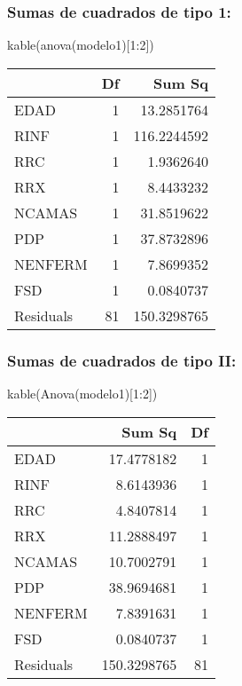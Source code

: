 \documentclass[
]{article}
\newenvironment{Shaded}{\begin{snugshade}}{\end{snugshade}}
\newcommand{\DecValTok}[1]{\textcolor[rgb]{0.00,0.00,0.81}{#1}}
\newcommand{\FunctionTok}[1]{\textcolor[rgb]{0.00,0.00,0.00}{#1}}
\newcommand{\NormalTok}[1]{#1}
\newcommand{\SpecialCharTok}[1]{\textcolor[rgb]{0.00,0.00,0.00}{#1}}
\begin{document}
\hypertarget{sumas-de-cuadrados-de-tipo-1}{%
\subsubsection{Sumas de cuadrados de tipo
1:}\label{sumas-de-cuadrados-de-tipo-1}}

\begin{Shaded}
\begin{Highlighting}[]
\FunctionTok{kable}\NormalTok{(}\FunctionTok{anova}\NormalTok{(modelo1)[}\DecValTok{1}\SpecialCharTok{:}\DecValTok{2}\NormalTok{])}
\end{Highlighting}
\end{Shaded}

\begin{longtable}[]{@{}lrr@{}}
\toprule
& Df & Sum Sq \\
\midrule
\endhead
EDAD & 1 & 13.2851764 \\
RINF & 1 & 116.2244592 \\
RRC & 1 & 1.9362640 \\
RRX & 1 & 8.4433232 \\
NCAMAS & 1 & 31.8519622 \\
PDP & 1 & 37.8732896 \\
NENFERM & 1 & 7.8699352 \\
FSD & 1 & 0.0840737 \\
Residuals & 81 & 150.3298765 \\
\bottomrule
\end{longtable}

\hypertarget{sumas-de-cuadrados-de-tipo-ii}{%
\subsubsection{Sumas de cuadrados de tipo
II:}\label{sumas-de-cuadrados-de-tipo-ii}}

\begin{Shaded}
\begin{Highlighting}[]
\FunctionTok{kable}\NormalTok{(}\FunctionTok{Anova}\NormalTok{(modelo1)[}\DecValTok{1}\SpecialCharTok{:}\DecValTok{2}\NormalTok{])}
\end{Highlighting}
\end{Shaded}

\begin{longtable}[]{@{}lrr@{}}
\toprule
& Sum Sq & Df \\
\midrule
\endhead
EDAD & 17.4778182 & 1 \\
RINF & 8.6143936 & 1 \\
RRC & 4.8407814 & 1 \\
RRX & 11.2888497 & 1 \\
NCAMAS & 10.7002791 & 1 \\
PDP & 38.9694681 & 1 \\
NENFERM & 7.8391631 & 1 \\
FSD & 0.0840737 & 1 \\
Residuals & 150.3298765 & 81 \\
\bottomrule
\end{longtable}
\end{document}
